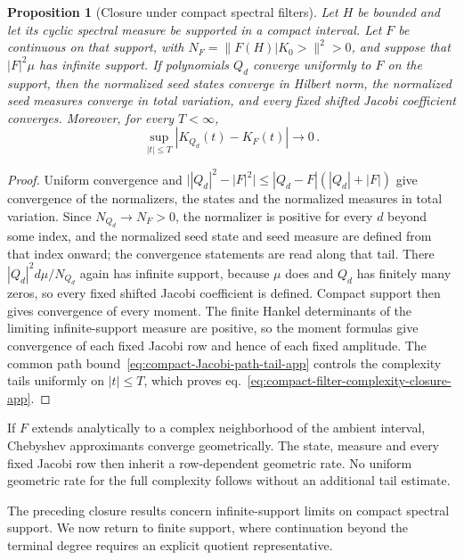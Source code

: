 \documentclass[a4paper,11pt]{article}
\def\ket#1{|#1>}%
\def\dd{d}%
\newtheorem{proposition}{Proposition}[section]
\theoremstyle{definition}
\theoremstyle{remark}
\newcommand{\ket}[1]{|#1\rangle}
\newcommand{\dd}{\mathrm d}
\begin{document}
\begin{proposition}[Closure under compact spectral filters]
\label{prop:compact-filter-closure-app}
Let $H$ be bounded and let its cyclic spectral measure be supported in a compact interval.  Let
$F$ be continuous on that support, with
$N_F=\|F(H)\ket{K_0}\|^2>0$, and suppose that $|F|^2\mu$ has infinite support.  If polynomials
$Q_d$ converge uniformly to $F$ on the support, then the normalized seed states converge in
Hilbert norm, the normalized seed measures converge in total variation, and every fixed shifted
Jacobi coefficient converges.  Moreover, for every $T<\infty$,
\begin{equation}
   \sup_{|t|\le T}|K_{Q_d}(t)-K_F(t)|\longrightarrow0\,.
   \label{eq:compact-filter-complexity-closure-app}
\end{equation}
\end{proposition}

\begin{proof}
Uniform convergence and
$\bigl||Q_d|^2-|F|^2\bigr|\le|Q_d-F|(|Q_d|+|F|)$ give convergence of the normalizers, the states
and the normalized measures in total variation.  Since $N_{Q_d}\to N_F>0$, the normalizer is positive for every $d$ beyond some index, and the normalized seed state and seed measure are defined from that index onward; the convergence statements are read along that tail.  There $|Q_d|^2\dd\mu/N_{Q_d}$ again has infinite support, because $\mu$ does and $Q_d$ has finitely many zeros, so every fixed shifted Jacobi coefficient is defined.  Compact support then gives convergence of every
moment.  The finite Hankel determinants of the limiting infinite-support measure are positive, so
the moment formulas give convergence of each fixed Jacobi row and hence of each fixed amplitude.
The common path bound~\eqref{eq:compact-Jacobi-path-tail-app} controls the complexity tails
uniformly on $|t|\le T$, which proves eq.~\eqref{eq:compact-filter-complexity-closure-app}.
\end{proof}

If $F$ extends analytically to a complex neighborhood of the ambient interval, Chebyshev
approximants converge geometrically.  The state, measure and every fixed Jacobi row then inherit a
row-dependent geometric rate.  No uniform geometric rate for the full complexity follows without
an additional tail estimate. 

The preceding closure results concern infinite-support limits on compact spectral support.
We now return to finite support, where continuation beyond the terminal degree requires an explicit
quotient representative.
\end{document}
